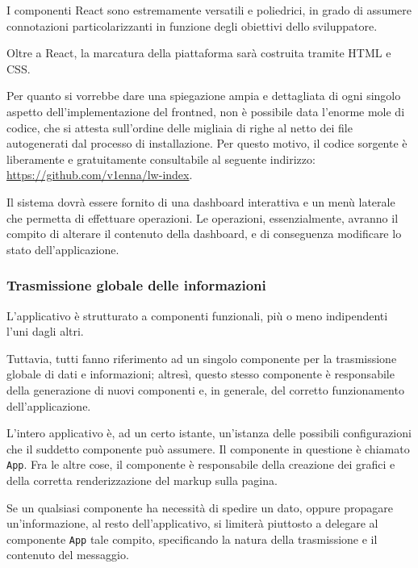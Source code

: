 I componenti React sono estremamente versatili e poliedrici, in grado di assumere connotazioni particolarizzanti in funzione degli obiettivi dello sviluppatore. 

Oltre a React, la marcatura della piattaforma sarà costruita tramite HTML e CSS. 

Per quanto si vorrebbe dare una spiegazione ampia e dettagliata di ogni singolo aspetto dell'implementazione del frontned, non è possibile data l'enorme mole di codice, che si attesta sull'ordine delle migliaia di righe al netto dei file autogenerati dal processo di installazione. Per questo motivo, il codice sorgente è liberamente e gratuitamente consultabile al seguente indirizzo: \url{https://github.com/v1enna/lw-index}.

\vspace{3mm}

Il sistema dovrà essere fornito di una dashboard interattiva e un menù laterale che permetta di effettuare operazioni. Le operazioni, essenzialmente, avranno il compito di alterare il contenuto della dashboard, e di conseguenza modificare lo stato dell'applicazione.

\newpage

\subsubsection{Trasmissione globale delle informazioni}

L'applicativo è strutturato a componenti funzionali, più o meno indipendenti l'uni dagli altri. 

Tuttavia, tutti fanno riferimento ad un singolo componente per la trasmissione globale di dati e informazioni; altresì, questo stesso componente è responsabile della generazione di nuovi componenti e, in generale, del corretto funzionamento dell'applicazione. 

L'intero applicativo è, ad un certo istante, un'istanza delle possibili configurazioni che il suddetto componente può assumere. Il componente in questione è chiamato \verb|App|. Fra le altre cose, il componente è responsabile della creazione dei grafici e della corretta renderizzazione del markup sulla pagina.

Se un qualsiasi componente ha necessità di spedire un dato, oppure propagare un'informazione, al resto dell'applicativo, si limiterà piuttosto a delegare al componente \verb|App| tale compito, specificando la natura della trasmissione e il contenuto del messaggio.

